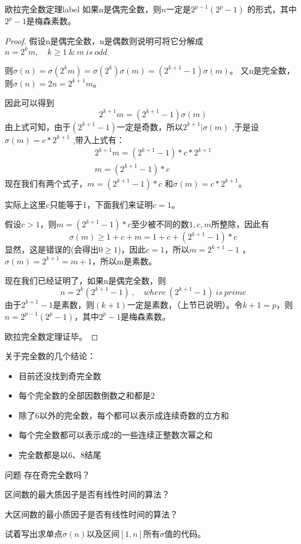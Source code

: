 \begin{theorem}{欧拉完全数定理}{label}
如果n是偶完全数，则$n$一定是$2^{p-1}(2^p-1)$ 的形式，其中$2^p-1$是梅森素数。
\end{theorem}

\begin{proof}
	假设n是偶完全数，n是偶数则说明可将它分解成$n=2^km,\quad k\ge 1 \ \&\ m\ is\ odd$
	
	则$\sigma(n)=\sigma(2^km)=\sigma(2^k)\sigma(m)=(2^{k+1}-1)\sigma(m)$。
	又n是完全数，则$\sigma(n)=2n=2^{k+1}m$。
	
	因此可以得到
	$$
	2^{k+1}m=(2^{k+1}-1)\sigma(m)
	$$
	由上式可知，由于$(2^{k+1}-1)$一定是奇数，所以$2^{k+1}| \sigma(m)$ ,于是设$\sigma(m)=c*2^{k+1}$ ,带入上式有：
	\begin{align*}
	2^{k+1}m=(2^{k+1}-1)*c*2^{k+1} \\
	m=(2^{k+1}-1)*c
	\end{align*}
	现在我们有两个式子，$m=(2^{k+1}-1)*c$ 和$\sigma(m)=c*2^{k+1}$。
	
	实际上这里c只能等于1，下面我们来证明$c=1$。
	
	假设$c>1$，则$m=(2^{k+1}-1)*c$至少被不同的数$1,c,m$所整除，因此有
	$$
	\sigma(m)\ge 1+c+m=1+c+(2^{k+1}-1)*c
	$$
	显然，这是错误的(会得出$0\ge 1$)，因此$c=1$，所以$m=2^{k+1}-1$  ，  $\sigma(m)=2^{k+1}=m+1$，所以m是素数。
	
	现在我们已经证明了，如果n是偶完全数，则
	$$
	n=2^k(2^{k+1}-1)\ ,\quad where \ (2^{k+1}-1)\ is \ prime
	$$
	由于$2^{k+1}-1$是素数，则$(k+1)$一定是素数，（上节已说明）。令$k+1=p$，则$n=2^{p-1}(2^p-1)$，其中$2^p-1$是梅森素数。
	
	欧拉完全数定理证毕。
\end{proof}

\vbox{}

\begin{note}
	关于完全数的几个结论：
	\begin{itemize}
		\item 目前还没找到奇完全数
		\item 每个完全数的全部因数倒数之和都是2
		\item 除了6以外的完全数，每个都可以表示成连续奇数的立方和
		\item 每个完全数都可以表示成2的一些连续正整数次幂之和
		\item 完全数都是以6、8结尾
	\end{itemize}
\end{note}

\vbox{}

\begin{custom}{问题}
	存在奇完全数吗？
\end{custom}

\vbox{}

\vbox{}


\begin{problemset}
	\item 区间数的最大质因子是否有线性时间的算法？
	\item 大区间数的最小质因子是否有线性时间的算法？
	\item 试着写出求单点$\sigma(n)$以及区间$[1,n]$所有$\sigma$值的代码。
\end{problemset}